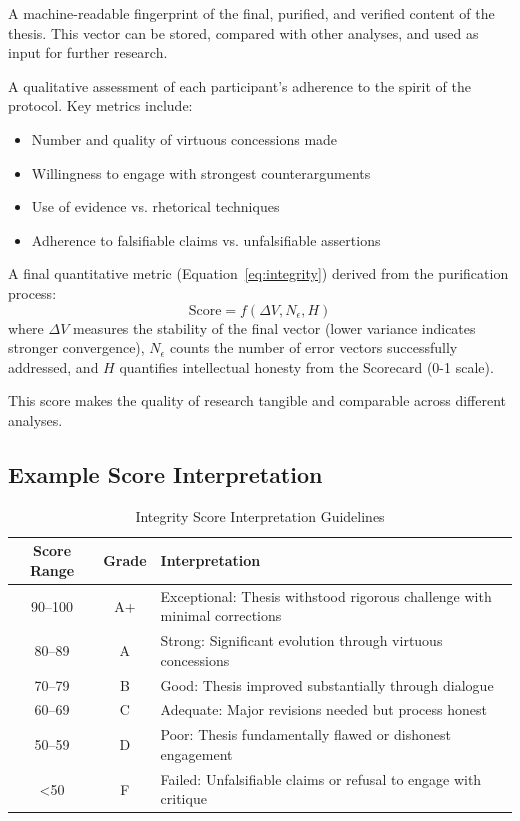 \documentclass[11pt,a4paper]{article}
\begin{document}
\begin{description}[style=nextline, leftmargin=0pt]
\item[The Final Synthetic Vector ($\vec{v}_{\text{synthetic}}$)] A machine-readable fingerprint of the final, purified, and verified content of the thesis. This vector can be stored, compared with other analyses, and used as input for further research.

\item[The Intellectual Honesty Scorecard] A qualitative assessment of each participant's adherence to the spirit of the protocol. Key metrics include:
\begin{itemize}[nosep]
    \item Number and quality of virtuous concessions made
    \item Willingness to engage with strongest counterarguments
    \item Use of evidence vs. rhetorical techniques
    \item Adherence to falsifiable claims vs. unfalsifiable assertions
\end{itemize}

\item[The Integrity Score] A final quantitative metric (Equation~\ref{eq:integrity}) derived from the purification process:
\[
\text{Score} = f(\Delta V, N_{\epsilon}, H)
\]
where $\Delta V$ measures the stability of the final vector (lower variance indicates stronger convergence), $N_{\epsilon}$ counts the number of error vectors successfully addressed, and $H$ quantifies intellectual honesty from the Scorecard (0-1 scale).

This score makes the quality of research tangible and comparable across different analyses.
\end{description}

\subsection{Example Score Interpretation}

\begin{table}[htbp]
\centering
\caption{Integrity Score Interpretation Guidelines}
\label{tab:score_interpretation}
\small
\begin{tabular}{@{}ccl@{}}
\toprule
\textbf{Score Range} & \textbf{Grade} & \textbf{Interpretation} \\
\midrule
90--100 & A+ & Exceptional: Thesis withstood rigorous challenge with minimal corrections \\
80--89 & A & Strong: Significant evolution through virtuous concessions \\
70--79 & B & Good: Thesis improved substantially through dialogue \\
60--69 & C & Adequate: Major revisions needed but process honest \\
50--59 & D & Poor: Thesis fundamentally flawed or dishonest engagement \\
<50 & F & Failed: Unfalsifiable claims or refusal to engage with critique \\
\bottomrule
\end{tabular}
\end{table}
\end{document}

